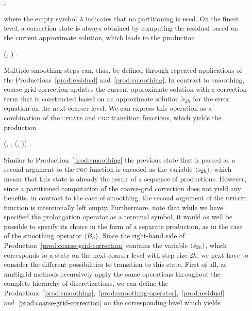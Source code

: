 \begin{bnf}
	 {
		 \bnfor \bnfes
	},
\label{prod:partitioning}
\end{bnf}
where the empty symbol $\lambda$ indicates that no partitioning is used. 
On the finest level, a correction state is always obtained by computing the residual based on the current approximate solution, which leads to the production
\begin{bnf}
	 {
		(, \bnfsp {}) 
	}.
\label{prod:residual}
\end{bnf}
Multiple smoothing steps can, thus, be defined through repeated applications of the Productions~\eqref{prod:residual} and~\eqref{prod:smoothing}.
In contrast to smoothing, coarse-grid correction updates the current approximate solution with a correction term that is constructed based on an approximate solution $\tilde{x}_{2h}$ for the error equation on the next coarser level.
We can express this operation as a combination of the \textsc{update} and \textsc{cgc} transition functions, which yields the production
\begin{bnf}
	 {
		(\bnfts{$\omega$}, \bnfsp \bnfes, \bnfsp {}(, \bnfsp {}))
	}.
\label{prod:coarse-grid-correction}
\end{bnf}
Similar to Production~\eqref{prod:smoothing} the previous state that is passed as a second argument to the \textsc{cgc} function is encoded as the variable $\langle s_{2h} \rangle$, which means that this state is already the result of a sequence of productions.
However, since a partitioned computation of the coarse-grid correction does not yield any benefits, in contrast to the case of smoothing, the second argument of the \textsc{update} function is intentionally left empty.
Furthermore, note that while we have specified the prolongation operator as a terminal symbol, it would as well be possible to specify its choice in the form of a separate production, as in the case of the smoothing operator $\langle B_h \rangle$.
Since the right-hand side of Production~\eqref{prod:coarse-grid-correction} contains the variable $\langle s_{2h} \rangle$, which corresponds to a state on the next-coarser level with step size $2h$, we next have to consider the different possibilities to transition to this state.
First of all, as multigrid methods recursively apply the same operations throughout the complete hierarchy of discretizations, we can define the Productions~\eqref{prod:smoothing},~\eqref{prod:smoothing-operator},~\eqref{prod:residual} and~\eqref{prod:coarse-grid-correction} on the corresponding level which yields
